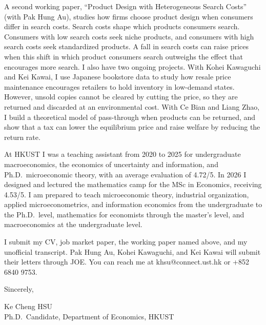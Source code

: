 \documentclass[11pt]{article}
\begin{document}
A second working paper, ``Product Design with Heterogeneous Search Costs'' (with Pak Hung Au), studies how firms choose product design when consumers differ in search costs. Search costs shape which products consumers search. Consumers with low search costs seek niche products, and consumers with high search costs seek standardized products. A fall in search costs can raise prices when this shift in which product consumers search outweighs the effect that encourages more search. I also have two ongoing projects. With Kohei Kawaguchi and Kei Kawai, I use Japanese bookstore data to study how resale price maintenance encourages retailers to hold inventory in low-demand states. However, unsold copies cannot be cleared by cutting the price, so they are returned and discarded at an environmental cost. With Ce Bian and Liang Zhao, I build a theoretical model of pass-through when products can be returned, and show that a tax can lower the equilibrium price and raise welfare by reducing the return rate.

At HKUST I was a teaching assistant from 2020 to 2025 for undergraduate macroeconomics, the economics of uncertainty and information, and Ph.D.\ microeconomic theory, with an average evaluation of 4.72/5. In 2026 I designed and lectured the mathematics camp for the MSc in Economics, receiving 4.53/5. I am prepared to teach microeconomic theory, industrial organization, applied microeconometrics, and information economics from the undergraduate to the Ph.D.\ level, mathematics for economists through the master's level, and macroeconomics at the undergraduate level.

I submit my CV, job market paper, the working paper named above, and my unofficial transcript. Pak Hung Au, Kohei Kawaguchi, and Kei Kawai will submit their letters through JOE. You can reach me at khsu@connect.ust.hk or +852 6840 9753.

\vspace{0.3em}
Sincerely,

\vspace{0.3em}
Ke Cheng HSU \\
Ph.D.\ Candidate, Department of Economics, HKUST
\end{document}
